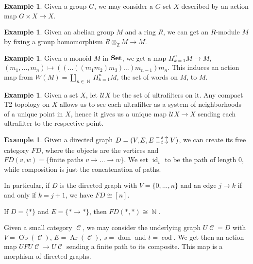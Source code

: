 \documentclass[a4paper,11pt,oneside,openany]{scrbook}
\newcommand{\catname}[1]{{\normalfont\textbf{#1}}}
\newcommand{\Set}{\catname{Set}}
\DeclareMathOperator{\C}{\mathcal{C}}
\DeclareMathOperator{\N}{\mathbb{N}}
\DeclareMathOperator{\Z}{\mathbb{Z}}
\DeclareMathOperator{\id}{id}
\DeclareMathOperator{\dom}{dom}
\DeclareMathOperator{\cod}{cod}
\DeclareMathOperator{\Ob}{Ob}
\DeclareMathOperator{\Ar}{Ar}
\theoremstyle{definition}
\theoremstyle{definition}
\newtheorem{exmp}[thm]{Example}
\begin{document}
	\begin{exmp}
		Given a group $G$, we may consider a $G$-set $X$ described by an action map $G\times X\rightarrow X$.
	\end{exmp}
	\begin{exmp}
		Given an abelian group $M$ and a ring $R$, we can get an $R$-module $M$ by fixing a group homomorphism $R\otimes_{\Z} M\rightarrow M$.
	\end{exmp}
	\begin{exmp}
		Given a monoid $M$ in $\Set$, we get a map $\Pi_{k=1}^n M\rightarrow M$, $(m_1,\ldots,m_n)\mapsto ((\ldots ((m_1m_2)m_3)\ldots )m_{n-1}) m_n$. This induces an action map from $W(M)=\amalg_{n\in\N}\Pi_{k=1}^n M$, the set of words on $M$, to $M$.
	\end{exmp}
	\begin{exmp}\label{ultrafilters}
		Given a set $X$, let $\mathcal{U}X$ be the set of ultrafilters on it. Any compact T2 topology on $X$ allows us to see each ultrafilter as a system of neighborhoods of a unique point in $X$, hence it gives us a unique map $\mathcal{U}X\rightarrow X$ sending each ultrafilter to the respective point.
	\end{exmp}
	\begin{exmp}
		Given a directed graph $D=(V,E,\hspace{-1.5mm}\begin{tikzcd}
		E\hspace{-1.5mm}\arrow[r, "t" description,  shift right=.5ex, shorten <= .3em, shorten >= .3em]  \arrow[r, "s" description, shift left=1ex, shorten <= .3em, shorten >= .3em] & \hspace{-1.5mm}V
		\end{tikzcd}\hspace{-1.5mm})$, we can create its free category $FD$, where the objects are the vertices and $FD(v,w)=\{\text{finite paths } v\rightarrow\ldots\rightarrow w\}$. We set $\id_v$ to be the path of length 0, while composition is just the concatenation of paths.
		
		In particular, if $D$ is the directed graph with $V=\{0,\ldots,n\}$ and an edge $j\rightarrow k$ if and only if $k=j+1$, we have $FD\cong [n]$.
		
		If $D=\{*\}$ and $E=\{*\rightarrow *\}$, then $FD(*,*)\cong\N$.
		
		Given a small category $\C$, we may consider the underlying graph $U\C=D$ with $V=\Ob(\C)$, $E=\Ar(\C)$, $s=\dom$ and $t=\cod$. We get then an action map $UFU\C\rightarrow U\C$ sending a finite path to its composite. This map is a morphism of directed graphs.
	\end{exmp}
\end{document}

